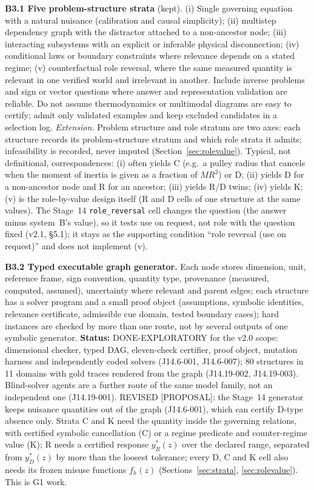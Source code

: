 \documentclass[10pt,a4paper]{article}
\newcommand{\tg}[1]{\textsc{[#1]}}
\begin{document}
\textbf{B3.1 Five problem-structure strata} (kept). (i) Single governing equation with a natural nuisance
(calibration and causal simplicity); (ii) multistep dependency graph with the distractor attached to a
non-ancestor node; (iii) interacting subsystems with an explicit or inferable physical disconnection;
(iv) conditional laws or boundary constraints where relevance depends on a stated regime; (v) counterfactual role
reversal, where the same measured quantity is relevant in one verified world and irrelevant in another. Include
inverse problems and sign or vector questions where answer and representation validation are reliable. Do not
assume thermodynamics or multimodal diagrams are easy to certify; admit only validated examples and keep excluded
candidates in a selection log.
\emph{Extension.} Problem structure and role stratum are two axes: each structure records its problem-structure
stratum and which role strata it admits; infeasibility is recorded, never imputed (Section~\ref{sec:rolevalue}).
Typical, not definitional, correspondences: (i) often yields C (e.g.\ a pulley radius that cancels when the
moment of inertia is given as a fraction of $MR^2$) or D; (ii) yields D for a non-ancestor node and R for an
ancestor; (iii) yields R/D twins; (iv) yields K; (v) is the role-by-value design itself (R and D cells of one
structure at the same values). The Stage~14 \texttt{role\_reversal} cell changes the question (the answer minus
system~B's value), so it tests use on request, not role with the question fixed (v2.1, \S5.1); it stays as the
supporting condition ``role reversal (use on request)'' and does not implement (v).

\textbf{B3.2 Typed executable graph generator.} Each node stores dimension, unit, reference frame, sign
convention, quantity type, provenance (measured, computed, assumed), uncertainty where relevant and parent edges;
each structure has a solver program and a small proof object (assumptions, symbolic identities, relevance
certificate, admissible cue domain, tested boundary cases); hard instances are checked by more than one route,
not by several outputs of one symbolic generator. \textbf{Status:} DONE-EXPLORATORY for the v2.0 scope:
dimensional checker, typed DAG, eleven-check certifier, proof object, mutation harness and independently coded
solvers (J14.6-001, J14.6-007); 80 structures in 11 domains with gold traces rendered from the graph
(J14.19-002, J14.19-003). Blind-solver agents are a further route of the same model family, not an independent
one (J14.19-001). REVISED \tg{PROPOSAL}: the Stage~14 generator keeps nuisance quantities out of the graph
(J14.6-001), which can certify D-type absence only. Strata C and K need the quantity inside the governing
relations, with certified symbolic cancellation (C) or a regime predicate and counter-regime value (K); R needs
a certified response $y^*_R(z)$ over the declared range, separated from $y^*_D(z)$ by more than the loosest
tolerance; every D, C and K cell
also needs its frozen misuse functions $f_h(z)$ (Sections~\ref{sec:strata}, \ref{sec:rolevalue}). This is G1
work.
\end{document}
